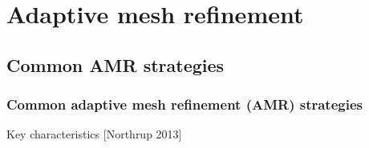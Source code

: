 \documentclass{beamer}
\begin{document}

\section[AMR]{Adaptive mesh refinement}

\subsection[AMR types]{Common AMR strategies}
\begin{frame}%
\frametitle{Common adaptive mesh refinement (AMR) strategies}
\tiny
\begin{minipage}[t][1\textheight]{1\textwidth}
\vspace{-15pt}
\begin{exampleblock}{Key characteristics}
[Northrup 2013]
\vspace{-20pt}
\begin{figure} \label{fig:AMRtypes}
\centering
{}

\end{figure}
\end{exampleblock}
\end{minipage}
\end{frame}
\end{document}
